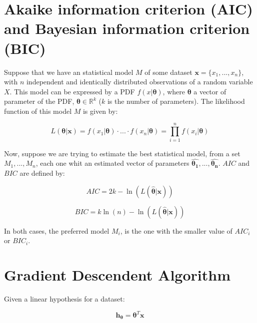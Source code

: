 \section{Akaike information criterion (AIC) and Bayesian information criterion (BIC)}

Suppose that we have an statistical model $M$ of some dataset ${\boldsymbol{x} = \{x_1, ..., x_n}\}$, with $n$ independent and identically distributed observations of a random variable $X$. This model can be expressed by a PDF $f(x| \boldsymbol{\theta})$, where $\boldsymbol{\theta}$ a vector of parameter of the PDF, $\boldsymbol{\theta} \in \mathbb{R}^{k}$ ($k$ is the number of parameters). The  likelihood function  of this model $M$ is given by:

\begin{equation}
L(\boldsymbol{\theta}|\boldsymbol{x} ) =  f(x_1|\boldsymbol{\theta})\cdot...\cdot f(x_n|\boldsymbol{\theta}) = \prod_{i = 1}^{n}f(x_i|\boldsymbol{\theta})
\end{equation}

Now, suppose we are trying to estimate the best statistical model, from a set ${M_1, ..., M_n}$, each one whit an estimated vector of parameters  ${\boldsymbol{\hat{\theta_1}}}, ..., {\boldsymbol{\hat{\theta_n}}}$. $AIC$ and $BIC$ are defined by:

\begin{equation}
\label{eq:aic}
AIC = 2k - \ln(L(\boldsymbol{\hat{\theta}}|\boldsymbol{x}))
\end{equation}

\begin{equation}
\label{eq:bic}
BIC = k\ln(n) - \ln(L(\boldsymbol{\hat{\theta}}|\boldsymbol{x}))
\end{equation}

In both cases, the preferred model $M_i$, is the one with the smaller value of $AIC_i$ or $BIC_i$.


\section{Gradient Descendent Algorithm}

Given a linear hypothesis for a dataset:

\begin{equation}
	\boldsymbol{h_{\theta}} = \boldsymbol{\theta}^{T}\boldsymbol{x} 
\end{equation}

